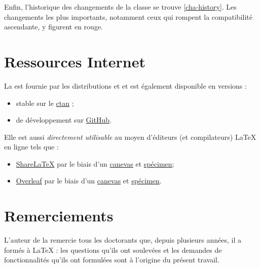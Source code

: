 Enfin, l'historique des changements de la classe se trouve \vref{cha-history}.
Les changements les plus importants, notamment ceux qui rompent la compatibilité
ascendante, y figurent en rouge.

\section{Ressources Internet}
\label{sec-ressources-internet}
%

La \yatCl{} est fournie par les distributions \texlive et \miktex et est également disponible en versions :
\begin{itemize}
\item stable sur le \href{http://www.ctan.org/pkg/yathesis}{\acrshort*{ctan}} ;
\item de développement sur \href{https://github.com/dbitouze/yathesis}{GitHub}.
\end{itemize}

Elle est aussi \emph{directement utilisable} au moyen d'éditeurs (et compilateurs)
\LaTeX{} en ligne%
%
%
%
%
tels que :
\begin{itemize}
\item \href{https://fr.sharelatex.com/}{ShareLaTeX} par le biais d'un
  \href{https://fr.sharelatex.com/templates/thesis/yathesis-template}{canevas}
  et
  \href{https://fr.sharelatex.com/templates/thesis/yathesis-specimen}{spécimen}\detailsspecimencanevas ;
\item \href{https://www.overleaf.com/}{Overleaf} par le biais d'un
  \href{https://www.overleaf.com/latex/templates/template-of-a-thesis-written-with-yathesis-class/nhtmtthnqwtd}{canevas}
  et
  \href{https://www.overleaf.com/latex/examples/sample-of-a-thesis-written-with-yathesis-class/nbcfvfqgnjfq}{spécimen}\detailsspecimencanevas.
\end{itemize}

\section{Remerciements}
\label{sec-remerciements}

L'auteur de la \yatCl{} remercie tous les doctorants que, depuis plusieurs
années, il a formés à \LaTeX{} : les questions qu'ils ont soulevées et les
demandes de fonctionnalités qu'ils ont formulées sont à l'origine du présent
travail.

